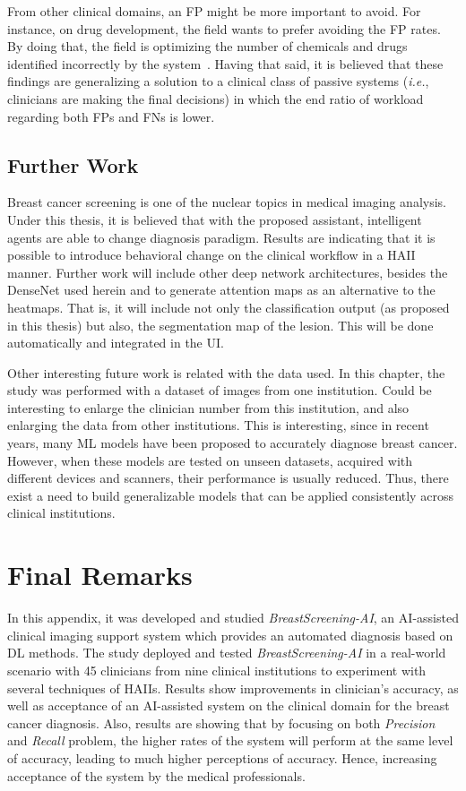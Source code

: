 From other clinical domains, an \ac{FP} might be more important to avoid.
For instance, on drug development, the field wants to prefer avoiding the \ac{FP} rates.
By doing that, the field is optimizing the number of chemicals and drugs identified incorrectly by the system~\cite{raja2017machine}.
Having that said, it is believed that these findings are generalizing a solution to a clinical class of passive systems ({\it i.e.}, clinicians are making the final decisions) in which the end ratio of workload regarding both \acp{FP} and \acp{FN} is lower.

\subsection{Further Work}
\label{sec:app003005004}

Breast cancer screening is one of the nuclear topics in medical imaging analysis.
Under this thesis, it is believed that with the proposed assistant, intelligent agents are able to change diagnosis paradigm.
Results are indicating that it is possible to introduce behavioral change on the clinical workflow in a \ac{HAII} manner.
Further work will include other deep network architectures, besides the DenseNet used herein and to generate attention maps as an alternative to the heatmaps.
That is, it will include not only the classification output (as proposed in this thesis) but also, the segmentation map of the lesion.
This will be done automatically and integrated in the \ac{UI}.

Other interesting future work is related with the data used. 
In this chapter, the study was performed with a dataset of images from one institution.
Could be interesting to enlarge the clinician number from this institution, and also enlarging the data from other institutions.
This is interesting, since in recent years, many \ac{ML} models have been proposed to accurately diagnose breast cancer.
However, when these models are tested on unseen datasets, acquired with different devices and scanners, their performance is usually reduced.
Thus, there exist a need to build generalizable models that can be applied consistently across clinical institutions.

\section{Final Remarks}
\label{sec:app003006}

In this appendix, it was developed and studied {\it BreastScreening-AI}, an \ac{AI}-assisted clinical imaging support system which provides an automated diagnosis based on \ac{DL} methods.
The study deployed and tested {\it BreastScreening-AI} in a real-world scenario with 45 clinicians from nine clinical institutions to experiment with several techniques of \acp{HAII}.
Results show improvements in clinician’s accuracy, as well as acceptance of an \ac{AI}-assisted system on the clinical domain for the breast cancer diagnosis.
Also, results are showing that by focusing on both {\it Precision} and {\it Recall} problem, the higher rates of the system will perform at the same level of accuracy, leading to much higher perceptions of accuracy.
Hence, increasing acceptance of the system by the medical professionals.

